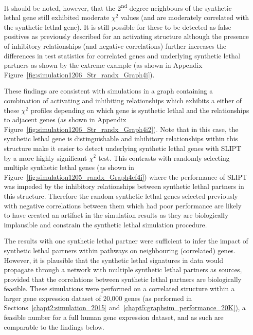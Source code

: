 
It should be noted, however, that the 2\textsuperscript{nd} degree neighbours of the \gls{synthetic lethal} gene still exhibited moderate $\chi^2$ values (and are moderately correlated with the \gls{synthetic lethal} gene). It is still possible for these to be detected as false positives as previously described for an activating  structure although the presence of inhibitory relationships (and negative correlations) further increases the differences in test statistics for correlated genes and underlying \gls{synthetic lethal} partners as shown by the extreme example (as shown in Appendix Figure~\ref{fig:simulation1206_Str_randx_Graph4i}).

These findings are consistent with simulations in a graph containing a combination of activating and inhibiting relationships which exhibits a either of these $\chi^2$ profiles depending on which gene is \gls{synthetic lethal} and the relationships to adjacent genes (as shown in Appendix Figure~\ref{fig:simulation1206_Str_randx_Graph4i2}). Note that in this case, the \gls{synthetic lethal} gene is distinguishable and inhibitory relationships within this  structure make it easier to detect underlying \gls{synthetic lethal} genes with \gls{SLIPT} by a more highly significant $\chi^2$ test. This contrasts with randomly selecting multiple \gls{synthetic lethal} genes (as shown in Figure~\ref{fig:simulation1205_randx_Graph4cf4i}) where the performance of \gls{SLIPT} was impeded by the inhibitory relationships between \gls{synthetic lethal} partners in this  structure. Therefore the random \gls{synthetic lethal} genes selected previously with negative correlations between them which had poor performance are likely to have created an artifact in the simulation results as they are biologically implausible and constrain the \gls{synthetic lethal} simulation procedure.

The results with one \gls{synthetic lethal} partner were sufficient to infer the impact of \gls{synthetic lethal} partners within pathways on neighbouring (correlated) genes. However,  it is plausible that the \gls{synthetic lethal} signatures in  data would propagate through a network with multiple \gls{synthetic lethal} partners as sources, provided that the correlations between \gls{synthetic lethal} partners are biologically feasible. These simulations were performed on a correlated  structure within a larger \gls{gene expression} dataset of 20,000 genes (as performed in Sections~\ref{chapt2:simulation_2015} and~\ref{chapt5:graphsim_performance_20K}), a feasible number for a full human \gls{gene expression} dataset, and as such are comparable to the findings below.

